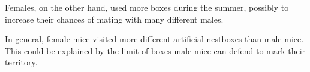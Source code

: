 Females, on the other hand, used more boxes during the summer, possibly to increase their chances of mating with many different males.

In general, female mice visited more different artificial nestboxes than male mice. This could be explained by the limit of boxes male mice can defend to mark their territory.
